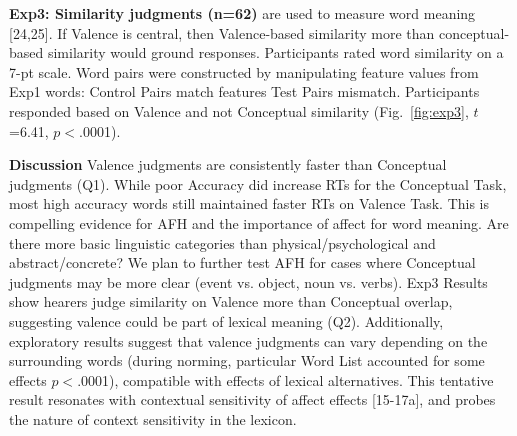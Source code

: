 \noindent \textbf{Exp3: Similarity judgments (n=62)} are used to measure word meaning [24,25]. If Valence is central, then Valence-based similarity more than conceptual-based similarity would ground responses. Participants rated word similarity on a 7-pt scale. Word pairs were constructed by manipulating feature values from Exp1 words: Control Pairs match features %
Test Pairs mismatch. Participants responded based on Valence and not Conceptual similarity (Fig.~\ref{fig:exp3}, $t$=6.41, $p<$.0001). 



\noindent \textbf{Discussion}
Valence judgments are consistently faster than Conceptual judgments (Q1). While poor Accuracy did increase RTs for the Conceptual Task, most high accuracy words still maintained faster RTs on Valence Task. This is compelling evidence for AFH and the importance of affect for word meaning. Are there more basic linguistic categories than physical/psychological and abstract/concrete? We plan to further test AFH for cases where Conceptual judgments may be more clear (event vs. object, noun vs. verbs). Exp3 Results show hearers judge similarity on Valence more than Conceptual overlap, suggesting valence could be part of lexical meaning (Q2). Additionally, exploratory results suggest that valence judgments can vary depending on the surrounding words (during norming, particular Word List accounted for some effects %
$p<$.0001), compatible with effects of lexical alternatives. This tentative result resonates with contextual sensitivity of affect effects [15-17a], and probes the nature of context sensitivity in the lexicon.


\newpage


